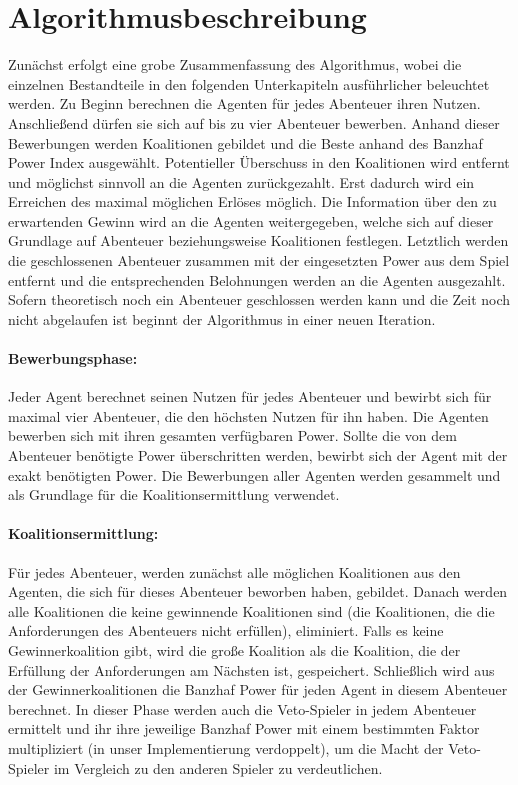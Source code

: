 \documentclass[fleqn,10pt]{SelfArx} %
\begin{document}
\section{Algorithmusbeschreibung}
\label{sec:Algorithmus}
Zunächst erfolgt eine grobe Zusammenfassung des Algorithmus, wobei die einzelnen Bestandteile in den folgenden Unterkapiteln ausführlicher beleuchtet werden. Zu Beginn berechnen die Agenten für jedes Abenteuer ihren Nutzen. Anschließend dürfen sie sich auf bis zu vier Abenteuer bewerben. Anhand dieser Bewerbungen werden Koalitionen gebildet und die Beste anhand des Banzhaf Power Index ausgewählt. Potentieller Überschuss in den Koalitionen wird entfernt und möglichst sinnvoll an die Agenten zurückgezahlt. Erst dadurch wird ein Erreichen des maximal möglichen Erlöses möglich. Die Information über den zu erwartenden Gewinn wird an die Agenten weitergegeben, welche sich auf dieser Grundlage auf Abenteuer beziehungsweise Koalitionen festlegen. Letztlich werden die geschlossenen Abenteuer zusammen mit der eingesetzten Power aus dem Spiel entfernt und die entsprechenden Belohnungen werden an die Agenten ausgezahlt. Sofern theoretisch noch ein Abenteuer geschlossen werden kann und die Zeit noch nicht abgelaufen ist beginnt der Algorithmus in einer neuen Iteration.

\paragraph{Bewerbungsphase:}
Jeder Agent berechnet seinen Nutzen für jedes Abenteuer und bewirbt sich für maximal vier Abenteuer, die den höchsten Nutzen für ihn haben. Die Agenten bewerben sich mit ihren gesamten verfügbaren Power. Sollte die von dem Abenteuer benötigte Power überschritten werden, bewirbt sich der Agent mit der exakt benötigten Power. Die Bewerbungen aller Agenten werden gesammelt und als Grundlage für die Koalitionsermittlung verwendet. 

\paragraph{Koalitionsermittlung:}
Für jedes Abenteuer, werden zunächst alle möglichen Koalitionen aus den Agenten, die sich für dieses Abenteuer beworben haben, gebildet. Danach werden alle Koalitionen die keine gewinnende Koalitionen sind (die Koalitionen, die die Anforderungen des Abenteuers nicht erfüllen), eliminiert. Falls es keine Gewinnerkoalition gibt, wird die große Koalition als die Koalition, die der Erfüllung der Anforderungen am Nächsten ist, gespeichert. Schließlich wird aus der Gewinnerkoalitionen die Banzhaf Power für jeden Agent in diesem Abenteuer berechnet. In dieser Phase werden auch die Veto-Spieler in jedem Abenteuer ermittelt und ihr ihre jeweilige Banzhaf Power mit einem bestimmten Faktor multipliziert (in unser Implementierung verdoppelt), um die Macht der Veto-Spieler im Vergleich zu den anderen Spieler zu verdeutlichen. 
\end{document}
